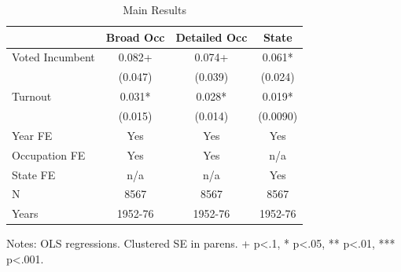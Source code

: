 \begin{table}[h]
\centering
\caption{Main Results}
\begin{tabular}{|l|c|c|c|}
\hline
 & Broad Occ & Detailed Occ & State \\
\hline \hline
Voted Incumbent  & 0.082+   & 0.074+   & 0.061*  \\
                 & (0.047)  & (0.039)  & (0.024) \\
\hline
Turnout          & 0.031*   & 0.028*   & 0.019*  \\
                 & (0.015)  & (0.014)  & (0.0090)  \\
\hline
Year FE          & Yes      & Yes      & Yes \\
Occupation FE    & Yes      & Yes      & n/a \\
State FE         & n/a      & n/a      & Yes \\
\hline
N                & 8567     & 8567     & 8567 \\
Years            & 1952-76  & 1952-76  & 1952-76 \\
\hline
\end{tabular}

\vspace{6pt}
\footnotesize
Notes: OLS regressions. Clustered SE in parens. + p<.1, * p<.05, ** p<.01, *** p<.001.
\end{table}
